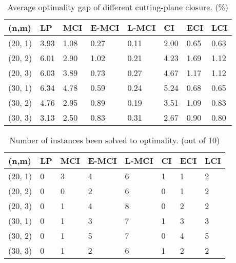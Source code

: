 \begin{table}
\centering
\caption{Average optimality gap of different cutting-plane closure. (\%)}
\begin{tabular}{  p{1cm} | p{1cm} | p{1cm} p{1cm} p{1cm} | p{1cm} p{1cm} p{1cm} }
\hline
(n,m) & LP   & MCI & E-MCI & L-MCI &  CI & ECI & LCI \\ 
\midrule
(20, 1) &  3.93  & 1.08  & 0.27  & 0.11  & 2.00  & 0.65  &  0.63  \\
(20, 2) & 6.01   & 2.90  & 1.02  &  0.21 & 4.23  & 1.69  & 1.12   \\
(20, 3) &  6.03  & 3.89  & 0.73  &  0.27 &  4.67 & 1.17  & 1.12  \\
\midrule
(30, 1) & 6.34  & 4.78 & 0.59  &0.24  &  5.24 & 0.68  & 0.65 \\ 
(30, 2) & 4.76  & 2.95 & 0.89  &0.19  &  3.51 & 1.09  & 0.83 \\
(30, 3) & 3.13  & 2.50 & 0.83  &0.31  &  2.67 & 0.90  & 0.80 \\
\bottomrule
 \end{tabular}
 \label{smalltable1}
\end{table}
\begin{table}
\centering
\caption{Number of instances been solved to optimality. (out of 10)}
\begin{tabular}{  p{1cm} | p{1cm} | p{1cm} p{1cm} p{1cm} | p{1cm} p{1cm} p{1cm} }
\hline
(n,m) & LP  & MCI & E-MCI & L-MCI &  CI & ECI & LCI \\
\midrule
(20, 1) &  0   & 3   & 4  &  6  & 1   & 1   &  2  \\
(20, 2) &   0  & 0   & 2  &   6 & 0   &  1  &  2  \\
(20, 3)  & 0  &  1  & 4   & 8  &  0  &  2  &  2 \\
\midrule
(30, 1) & 0  & 1 & 3  & 7  &  1 & 3  & 3 \\ 
(30, 2) & 0  & 1 & 5  & 7  &  0 & 4  & 5 \\
(30, 3) & 0  & 1 & 2  & 6  &  1 & 2  & 2 \\
\bottomrule
 \end{tabular}
 \label{smalltable2}
\end{table}


